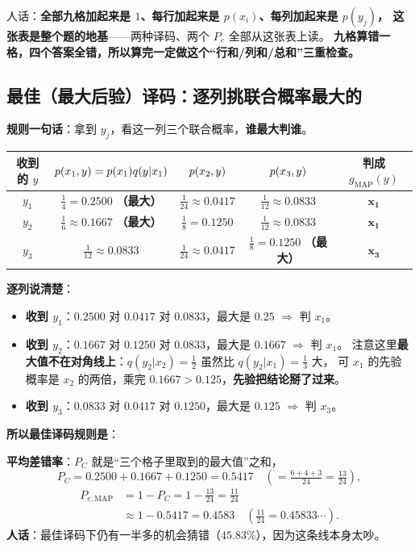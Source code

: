 \documentclass[11pt,a4paper]{ctexart}
\begin{document}
人话：\textbf{全部九格加起来是 $1$、每行加起来是 $p(x_i)$、每列加起来是 $p(y_j)$，
这张表是整个题的地基}——两种译码、两个 $P_e$ 全部从这张表上读。
\textbf{九格算错一格，四个答案全错，所以算完一定做这个“行和/列和/总和”三重检查。}

\subsection{最佳（最大后验）译码：逐列挑联合概率最大的}

\textbf{规则一句话}：拿到 $y_j$，看这一列三个联合概率，\textbf{谁最大判谁}。

\begin{center}\small
\setlength{\tabcolsep}{5pt}
\begin{tabular}{@{}c|c|c|c|c@{}}
\toprule
收到的 $y$ & $p\!\left(x_1,y\right)=p(x_1)q(y|x_1)$ & $p\!\left(x_2,y\right)$ & $p\!\left(x_3,y\right)$ & 判成 $g_{\mathrm{MAP}}(y)$\\
\midrule
$y_1$ & $\tfrac14=0.2500$ \textbf{（最大）} & $\tfrac1{24}\approx0.0417$ & $\tfrac1{12}\approx0.0833$ & $\mathbf{x_1}$\\
$y_2$ & $\tfrac16\approx0.1667$ \textbf{（最大）} & $\tfrac18=0.1250$ & $\tfrac1{12}\approx0.0833$ & $\mathbf{x_1}$\\
$y_3$ & $\tfrac1{12}\approx0.0833$ & $\tfrac1{24}\approx0.0417$ & $\tfrac18=0.1250$ \textbf{（最大）} & $\mathbf{x_3}$\\
\bottomrule
\end{tabular}
\end{center}

\textbf{逐列说清楚}：
\begin{itemize}[leftmargin=1.8em,itemsep=1pt,topsep=2pt]
  \item \textbf{收到 $y_1$}：$0.2500$ 对 $0.0417$ 对 $0.0833$，最大是 $0.25$ $\Rightarrow$ 判 $x_1$。
  \item \textbf{收到 $y_2$}：$0.1667$ 对 $0.1250$ 对 $0.0833$，最大是 $0.1667$ $\Rightarrow$ 判 $x_1$。
        注意这里\textbf{最大值不在对角线上}：$q(y_2|x_2)=\frac12$ 虽然比 $q(y_2|x_1)=\frac13$ 大，
        可 $x_1$ 的先验概率是 $x_2$ 的两倍，乘完 $0.1667>0.125$，\textbf{先验把结论掰了过来}。
  \item \textbf{收到 $y_3$}：$0.0833$ 对 $0.0417$ 对 $0.1250$，最大是 $0.125$ $\Rightarrow$ 判 $x_3$。
\end{itemize}

\textbf{所以最佳译码规则是}：

\textbf{平均差错率}：$P_C$ 就是“三个格子里取到的最大值”之和，
\[
P_C=0.2500+0.1667+0.1250=0.5417\quad\left(=\tfrac{6+4+3}{24}=\tfrac{13}{24}\right),
\]
\begin{align*}
P_{e,\mathrm{MAP}}&=1-P_C=1-\tfrac{13}{24}=\tfrac{11}{24}\\
&\approx1-0.5417=\boxed{0.4583}\quad\left(\tfrac{11}{24}=0.45833\cdots\right).
\end{align*}
\textbf{人话}：最佳译码下仍有一半多的机会猜错（$45.83\%$），因为这条线本身太吵。
\end{document}
